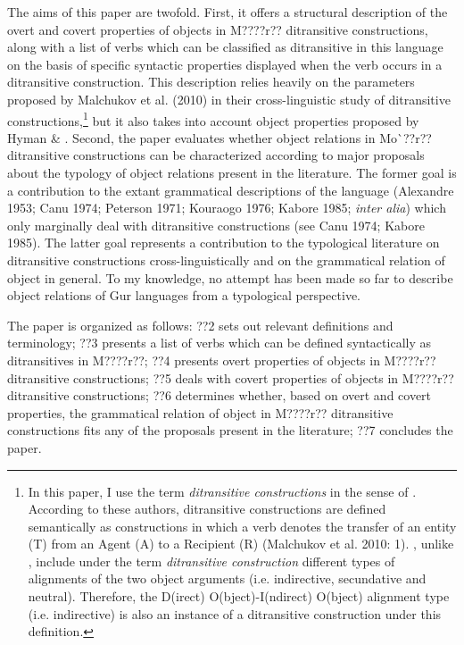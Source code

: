 \documentclass[output=paper]{langsci/langscibook}
\begin{document}
The aims of this paper are twofold. First, it offers a structural description of the overt and covert properties of objects in M????r?? ditransitive constructions, along with a list of verbs which can be classified as ditransitive in this language on the basis of specific syntactic properties displayed when the verb occurs in a ditransitive construction. This description relies heavily on the parameters proposed by Malchukov et al.\textit{ }(2010) in their cross-linguistic study of ditransitive constructions,\footnote{ In this paper, I use the term \textit{ditransitive constructions} in the sense of \citet{MalchukovEtAl2010}. According to these authors, ditransitive constructions are defined semantically as constructions in which a verb denotes the transfer of an entity (T) from an Agent (A) to a Recipient (R) (Malchukov et al. 2010: 1). \citet{MalchukovEtAl2010}, unlike \citet{Goldberg1995}, include under the term \textit{ditransitive construction} different types of alignments of the two object arguments (i.e. indirective, secundative and neutral). Therefore, the D(irect) O(bject)-I(ndirect) O(bject) alignment type (i.e. indirective) is also an instance of a ditransitive construction under this definition. } but it also takes into account object properties proposed by Hyman \& \citet{Duranti1982}.  Second, the paper evaluates whether object relations in Mo\`{ }??r?? ditransitive constructions can be characterized according to major proposals about the typology of object relations present in the literature. The former goal is a contribution to the extant grammatical descriptions of the language (Alexandre 1953; Canu 1974; Peterson 1971; Kouraogo 1976; Kabore 1985; \textit{inter alia}) which only marginally deal with ditransitive constructions (see Canu 1974; Kabore 1985). The latter goal represents a contribution to the typological literature on ditransitive constructions cross-linguistically and on the grammatical relation of object in general. To my knowledge, no attempt has been made so far to describe object relations of Gur languages from a typological perspective.  

The paper is organized as follows: ??2 sets out relevant definitions and terminology; ??3 presents a list of verbs which can be defined syntactically as ditransitives in M????r??; ??4 presents overt properties of objects in M????r?? ditransitive constructions; ??5 deals with covert properties of objects in M????r?? ditransitive constructions; ??6 determines whether, based on overt and covert properties, the grammatical relation of object in M????r?? ditransitive constructions fits any of the proposals present in the literature; ??7 concludes the paper.    
\end{document}
